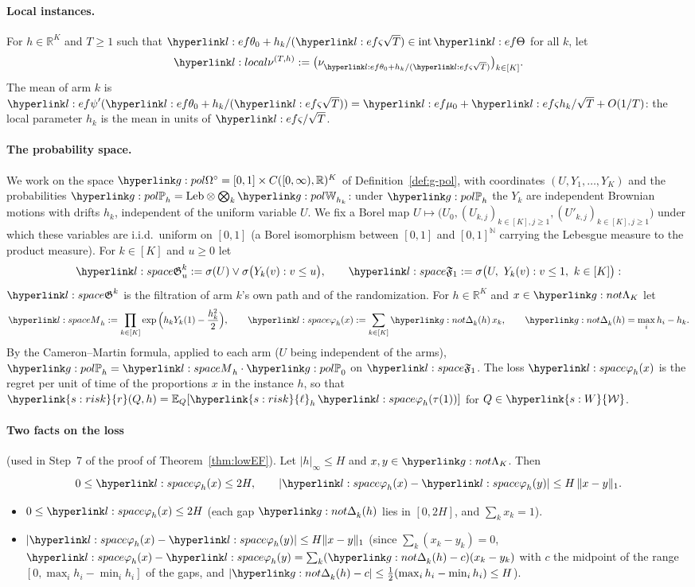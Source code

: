 \documentclass[11pt]{article}
\newcommand{\dt}[1]{\hypertarget{#1}{}}
\DeclareRobustCommand{\sy}[2]{{\hyperlink{#1}{#2}}}
\newcommand{\R}{\mathbb{R}}
\newcommand{\Nat}{\mathbb{N}}
\newcommand{\E}{\mathbb{E}}
\newcommand{\1}{\mathbf{1}}
\newcommand{\Wc}{\sy{s:W}{\mathcal W}}
\newcommand{\rk}{\sy{s:risk}{r}}
\newcommand{\lh}{\sy{s:risk}{\ell}}
\begin{document}
\paragraph{Local instances.}\dt{l:local} For $h\in\R^K$ and $T\ge1$ such that $\lthz+h_k/(\lsd\sqrt T)\in\operatorname{int}\lTh$ for all $k$, let
\[
\lnuT:=\big(\nu_{\lthz+h_k/(\lsd\sqrt T)}\big)_{k\in[K]} .
\]
The mean of arm $k$ is $\lpsi'(\lthz+h_k/(\lsd\sqrt T))=\lmuz+\lsd h_k/\sqrt T+O(1/T)$: the local parameter $h_k$ is the mean in units of $\lsd/\sqrt T$.

\paragraph{The probability space.}\dt{l:space} We work on the space $\gOs=[0,1]\times C([0,\infty),\R)^K$ of Definition~\ref{def:g-pol}, with coordinates
$(U,Y_1,\dots,Y_K)$ and the probabilities $\gPh_h=\mathrm{Leb}\otimes\bigotimes_k\gWi_{h_k}$: under $\gPh_h$ the $Y_k$ are independent Brownian motions with drifts
$h_k$, independent of the uniform variable $U$. We fix a Borel map $U\mapsto\big(U_0,(U_{k,j})_{k\in[K],j\ge1},(U'_{k,j})_{k\in[K],j\ge1}\big)$ under which these variables
are i.i.d.\ uniform on $[0,1]$ (a Borel isomorphism between $[0,1]$ and $[0,1]^{\Nat}$ carrying the Lebesgue measure to the product measure). For $k\in[K]$ and $u\ge0$
let
\[
\lG^k_u:=\sigma(U)\vee\sigma\big(Y_k(v):v\le u\big),\qquad \lFo:=\sigma\big(U,\ Y_k(v):v\le1,\ k\in[K]\big):
\]
$\lG^k$ is the filtration of arm $k$'s own path and of the randomization. For $h\in\R^K$ and $x\in\gSmp$ let
\[
\lM_h:=\prod_{k\in[K]}\exp\Big(h_kY_k(1)-\frac{h_k^2}2\Big),\qquad \lphi_h(x):=\sum_{k\in[K]}\gGp_k(h)\,x_k,\qquad \gGp_k(h)=\max_ih_i-h_k .
\]
By the Cameron--Martin formula, applied to each arm ($U$ being independent of the arms), $\gPh_h=\lM_h\cdot\gPh_0$ on $\lFo$. The loss $\lphi_h(x)$ is the regret per unit
of time of the proportions $x$ in the instance $h$, so that $\rk(Q,h)=\E_Q[\lh_h\,\lphi_h(\tau(1))]$ for $Q\in\Wc$.

\paragraph{Two facts on the loss} (used in Step~7 of the proof of Theorem~\ref{thm:lowEF}). Let $|h|_\infty\le H$ and $x,y\in\gSmp$. Then
\begin{equation}\label{eq:low-L}
0\le\lphi_h(x)\le2H,\qquad |\lphi_h(x)-\lphi_h(y)|\le H\,\|x-y\|_1 .
\end{equation}
\begin{itemize}
\item $0\le\lphi_h(x)\le2H$ (each gap $\gGp_k(h)$ lies in $[0,2H]$, and $\sum_kx_k=1$).
\item $|\lphi_h(x)-\lphi_h(y)|\le H\|x-y\|_1$ (since $\sum_k(x_k-y_k)=0$, $\lphi_h(x)-\lphi_h(y)=\sum_k(\gGp_k(h)-c)(x_k-y_k)$ with $c$ the midpoint of the range
$[0,\max_ih_i-\min_ih_i]$ of the gaps, and $|\gGp_k(h)-c|\le\frac12(\max_ih_i-\min_ih_i)\le H$).
\end{itemize}
\end{document}

